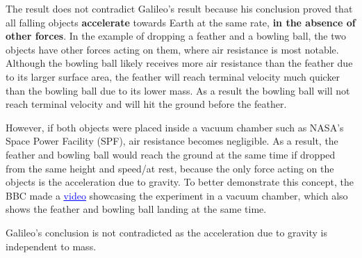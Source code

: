 \documentclass[12pt,letterpaper]{article}
\newcommand\tab[1][1cm]{\hspace*{#1}}
\begin{document}
\noindent
\begin{flushleft}
	\tab The result does not contradict Galileo’s result because his conclusion proved that all \tab falling objects \textbf{accelerate} towards Earth at the same rate, \textbf{in the absence of other \tab forces}. In the example of dropping a feather and a bowling ball, the two objects have \tab other forces acting on them, where air resistance is most notable. Although the \tab bowling ball likely receives more air resistance than the feather due to its larger \tab surface area, the feather will reach terminal velocity much quicker than the bowling \tab ball due to its lower mass. As a result the bowling ball will not reach terminal \tab velocity and will hit the ground before the feather.

	\vspace{4mm}
	\tab However, if both objects were placed inside a vacuum chamber such as NASA’s Space \tab Power Facility (SPF), air resistance becomes negligible. As a result, the feather and \tab bowling ball would reach the ground at the same time if dropped from the same \tab height and speed/at rest, because the only force acting on the objects is the \tab acceleration due to gravity. To better demonstrate this concept, the BBC made a \tab \href{https://youtu.be/E43-CfukEgs?t=172}{\textcolor{blue}{\underline{video}}} showcasing the experiment in a vacuum chamber, which also shows the feather \tab and bowling ball landing at the same time.

	\vspace{4mm}
	\tab Galileo’s conclusion is not contradicted as the acceleration due to gravity is \tab independent to mass.

\end{flushleft}


\end{document}
